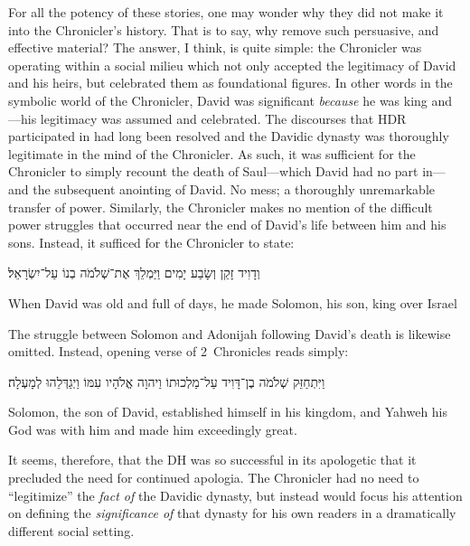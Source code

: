 For all the potency of these stories, one may wonder why they did not make it into the Chronicler's history. That is to say, why remove such persuasive, and effective material? The answer, I think, is quite simple: the Chronicler was operating within a social milieu which not only accepted the legitimacy of David and his heirs, but celebrated them as foundational figures. In other words in the symbolic world of the Chronicler, David was significant \emph{because} he was king and---his legitimacy was assumed and celebrated. The discourses that HDR participated in had long been resolved and the Davidic dynasty was thoroughly legitimate in the mind of the Chronicler. As such, it was sufficient for the Chronicler to simply recount the death of Saul---which David had no part in---and the subsequent anointing of David. No mess; a thoroughly unremarkable transfer of power. Similarly, the Chronicler makes no mention of the difficult power struggles that occurred near the end of David's life between him and his sons. Instead, it sufficed for the Chronicler to state: 
    \begin{hebrewtext}
        וְדָוִיד זָקֵן וְשָׂבַע יָמִים וַיַּמְלֵךְ אֶת־שְׁלֹמֹה בְנוֹ עַל־יִשְׂרָאֵל׃
    \end{hebrewtext}
    \begin{translation}
        When David was old and full of days, he made Solomon, his son, king over Israel
    \end{translation}
\noindent
The struggle between Solomon and Adonijah following David's death is likewise omitted. Instead, opening verse of 2~Chronicles reads simply:
    \begin{hebrewtext}
        וַיִּתְחַזֵּק שְׁלֹמֹה בֶן־דָּוִיד עַל־מַלְכוּתוֹ וַיהוָה אֱלֹהָיו עִמּוֹ וַיְגַדְּלֵהוּ לְמָעְלָה׃
    \end{hebrewtext}
    \begin{translation}
        Solomon, the son of David, established himself in his kingdom, and Yahweh his God was with him and made him exceedingly great.   
    \end{translation}
\noindent
It seems, therefore, that the DH was so successful in its apologetic that it precluded the need for continued apologia. The Chronicler had no need to ``legitimize'' the \emph{fact of} the Davidic dynasty, but instead would focus his attention on defining the \emph{significance of} that dynasty for his own readers in a dramatically different social setting.

